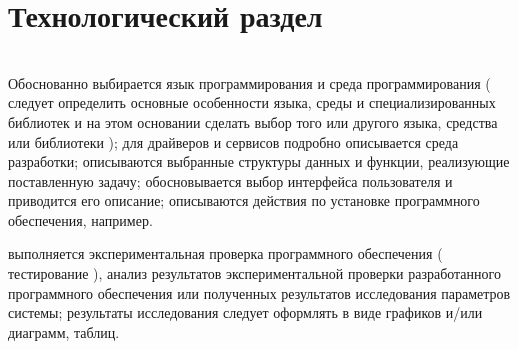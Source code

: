 \chapter{Технологический раздел}

\HRule \\
Обоснованно выбирается язык программирования и среда программирования ( следует определить основные особенности языка, среды и специализированных библиотек и на этом основании сделать выбор того или другого языка, средства или библиотеки );  для драйверов и сервисов подробно описывается среда разработки; описываются выбранные структуры данных и функции, реализующие поставленную задачу; обосновывается выбор интерфейса пользователя и приводится его описание; описываются действия по установке программного обеспечения, например.

 выполняется экспериментальная проверка программного обеспечения ( тестирование ), анализ  результатов экспериментальной проверки разработанного программного обеспечения или полученных результатов исследования параметров системы; результаты исследования следует оформлять в виде графиков и/или диаграмм, таблиц.
